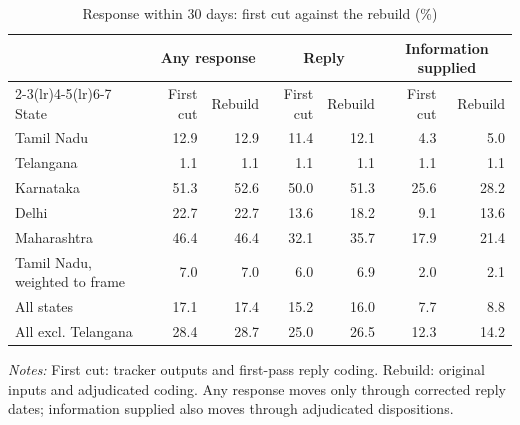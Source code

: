 \begin{table}[!htbp]
\centering
\caption{Response within 30 days: first cut against the rebuild (\%)}
\label{tab:tab_changes}
\small
\begin{threeparttable}
\begin{tabular}{lrrrrrr}
\toprule
& \multicolumn{2}{c}{Any response} & \multicolumn{2}{c}{Reply} & \multicolumn{2}{c}{Information supplied} \\ \cmidrule(lr){2-3}\cmidrule(lr){4-5}\cmidrule(lr){6-7} State & First cut & Rebuild & First cut & Rebuild & First cut & Rebuild \\
\midrule
Tamil Nadu & 12.9 & 12.9 & 11.4 & 12.1 & 4.3 & 5.0 \\
Telangana & 1.1 & 1.1 & 1.1 & 1.1 & 1.1 & 1.1 \\
Karnataka & 51.3 & 52.6 & 50.0 & 51.3 & 25.6 & 28.2 \\
Delhi & 22.7 & 22.7 & 13.6 & 18.2 & 9.1 & 13.6 \\
Maharashtra & 46.4 & 46.4 & 32.1 & 35.7 & 17.9 & 21.4 \\
Tamil Nadu, weighted to frame & 7.0 & 7.0 & 6.0 & 6.9 & 2.0 & 2.1 \\
All states & 17.1 & 17.4 & 15.2 & 16.0 & 7.7 & 8.8 \\
All excl. Telangana & 28.4 & 28.7 & 25.0 & 26.5 & 12.3 & 14.2 \\
\bottomrule
\end{tabular}
\begin{tablenotes}[flushleft]\footnotesize
\item \textit{Notes:} First cut: tracker outputs and first-pass reply coding. Rebuild: original inputs and adjudicated coding. Any response moves only through corrected reply dates; information supplied also moves through adjudicated dispositions.
\end{tablenotes}
\end{threeparttable}
\end{table}
